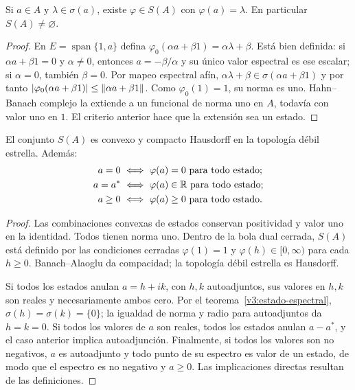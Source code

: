 \begin{teorema}\label{v3:estado-espectral}
Si $a\in A$ y $\lambda\in\sigma(a)$, existe $\varphi\in S(A)$ con $\varphi(a)=\lambda$. En particular $S(A)\ne\varnothing$.
\end{teorema}
\begin{proof}
En $E=\operatorname{span}\{1,a\}$ defina $\varphi_0(\alpha a+\beta1)=\alpha\lambda+\beta$. Está bien definida: si $\alpha a+\beta1=0$ y $\alpha\ne0$, entonces $a=-\beta/\alpha$ y su único valor espectral es ese escalar; si $\alpha=0$, también $\beta=0$. Por mapeo espectral afín, $\alpha\lambda+\beta\in\sigma(\alpha a+\beta1)$ y por tanto $|\varphi_0(\alpha a+\beta1)|\le\left\lVert\alpha a+\beta1\right\rVert$. Como $\varphi_0(1)=1$, su norma es uno. Hahn--Banach complejo la extiende a un funcional de norma uno en $A$, todavía con valor uno en $1$. El criterio anterior hace que la extensión sea un estado.
\end{proof}

\begin{proposicion}\label{v3:estados-compactos-separan}
El conjunto $S(A)$ es convexo y compacto Hausdorff en la topología débil estrella. Además:
\[
 \begin{aligned}
 a=0&\ \Longleftrightarrow\ \varphi(a)=0\text{ para todo estado};\\
 a=a^*&\ \Longleftrightarrow\ \varphi(a)\in\mathbb R\text{ para todo estado};\\
 a\ge0&\ \Longleftrightarrow\ \varphi(a)\ge0\text{ para todo estado}.
 \end{aligned}
\]
\end{proposicion}
\begin{proof}
Las combinaciones convexas de estados conservan positividad y valor uno en la identidad. Todos tienen norma uno. Dentro de la bola dual cerrada, $S(A)$ está definido por las condiciones cerradas $\varphi(1)=1$ y $\varphi(h)\in[0,\infty)$ para cada $h\ge0$. Banach--Alaoglu da compacidad; la topología débil estrella es Hausdorff.

Si todos los estados anulan $a=h+ik$, con $h,k$ autoadjuntos, sus valores en $h,k$ son reales y necesariamente ambos cero. Por el teorema~\ref{v3:estado-espectral}, $\sigma(h)=\sigma(k)=\{0\}$; la igualdad de norma y radio para autoadjuntos da $h=k=0$. Si todos los valores de $a$ son reales, todos los estados anulan $a-a^*$, y el caso anterior implica autoadjunción. Finalmente, si todos los valores son no negativos, $a$ es autoadjunto y todo punto de su espectro es valor de un estado, de modo que el espectro es no negativo y $a\ge0$. Las implicaciones directas resultan de las definiciones.
\end{proof}


